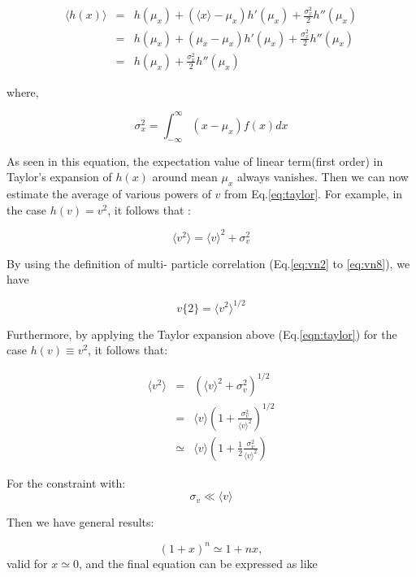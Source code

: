 \begin{eqnarray}
	\langle h(x) \rangle &=& h(\mu_x) + ( \langle x \rangle - \mu_x )h'(\mu_x) + \frac{\sigma_x^2}{2}h''(\mu_x)  \\
	&=&  h(\mu_x) + ( \mu_x- \mu_x) h'(\mu_x) + \frac{\sigma_x^2}{2}h''(\mu_x) \\ 
	&=& h(\mu_x) +\frac{\sigma_x^2}{2}h''(\mu_x) 	\label{eqn:taylor}
\end{eqnarray} 
	
	where,
	
	$$ \sigma_x^2 = \int_{-\infty}^{\infty} (x-\mu_x)f(x)dx $$
	\smallskip
	
As seen in this equation, the expectation value of linear term(first order) in Taylor's expansion of $h(x)$ around mean $\mu_x$ always vanishes. Then we can now estimate the average of various powers of $v$ from Eq.\ref{eq:taylor}. For example, in the case $h(v)=v^2$, it follows that :

\begin{equation}
	\langle v^2 \rangle = \langle v \rangle^2 + \sigma_v^2 
\end{equation}

By using the definition of multi- particle correlation (Eq.\ref{eq:vn2} to \ref{eq:vn8}), we have 

\begin{equation}
	v\{2\} = \langle v^2 \rangle ^{1/2}
\end{equation}

Furthermore, by applying the Taylor expansion above (Eq.\ref{eqn:taylor}) for the case $h(v) \equiv v^2$, it follows that:

\begin{eqnarray}
		\langle v^2 \rangle &=& (\langle v \rangle^2 + \sigma_v^2)^{1/2} \\
		&=& \langle v \rangle \left( 1+\frac{\sigma_v^2}{\langle v \rangle^2} \right)^{1/2} \\ 
		&\simeq & \langle v \rangle \left( 1+\frac{1}{2} \frac{\sigma_v^2}{\langle v \rangle^2} \right) 
\end{eqnarray}

For the constraint with:
\begin{equation}
	\sigma_v \ll \langle v \rangle
\end{equation}

Then we have general results:

\begin{equation}
	(1+x)^n \simeq 1 + nx,
\end{equation}
valid for $x \simeq 0$, and the final equation can be expressed as like

